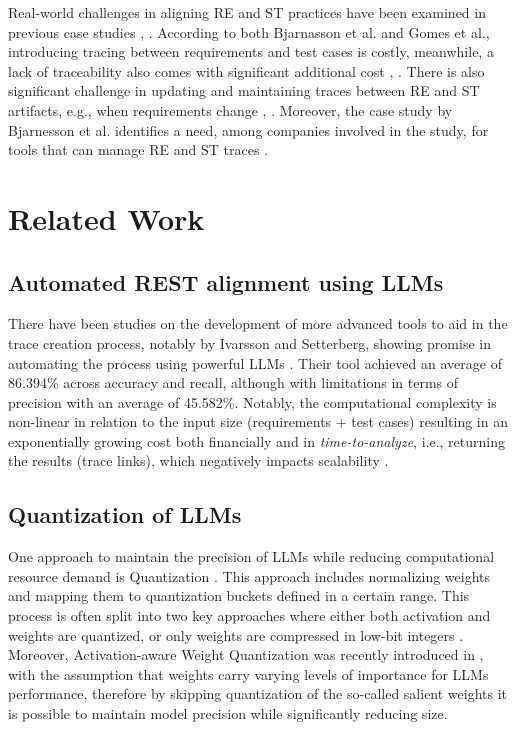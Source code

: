 \documentclass[conference]{IEEEtran}
\begin{document}
Real-world challenges in aligning RE and ST practices have been examined in
previous case studies \cite{bjarnason2014Challenges},
\cite{gomesdeoliveiranetoChallengesAligningRequirements2017}. According to both
Bjarnasson et al. and Gomes et al., introducing tracing between requirements and
test cases is costly, meanwhile, a lack of traceability also comes with
significant additional cost \cite{bjarnason2014Challenges},
\cite{gomesdeoliveiranetoChallengesAligningRequirements2017}. There is also
significant challenge in updating and maintaining traces between RE and ST
artifacts, e.g., when requirements change
\cite{bjarnason2014Challenges},
\cite{gomesdeoliveiranetoChallengesAligningRequirements2017}. Moreover, the case
study by Bjarnesson et al. identifies a need, among companies involved in the
study, for tools that can manage RE and ST traces
\cite{bjarnason2014Challenges}.

\section{Related Work}\label{relatedWork}

\subsection{Automated REST alignment using LLMs}

There have been studies on the development of more advanced tools to aid in the trace
creation process, notably by Ivarsson and Setterberg, showing promise in
automating the process using powerful LLMs \cite{ivarsson2023automated}. Their
tool achieved an average of 86.394\% across accuracy and recall, although with
limitations in terms of precision with an average of 45.582\%. Notably, the
computational complexity is non-linear in relation to the input size
(requirements + test cases) resulting in an exponentially growing cost both
financially and in \textit{time-to-analyze}, i.e., returning the results (trace
links), which negatively impacts scalability \cite{ivarsson2023automated}.


\subsection{Quantization of LLMs} One approach to maintain the precision of LLMs
while reducing computational resource demand is Quantization
\cite{dettmers2022llmint88bitmatrixmultiplication}. This approach includes
normalizing weights and mapping them to quantization buckets defined in a
certain range\cite{dettmers2022llmint88bitmatrixmultiplication}. This process is
often split into two key approaches where either both activation and weights are
quantized, or only weights are compressed in low-bit integers
\cite{dettmers2022llmint88bitmatrixmultiplication}. Moreover, Activation-aware
Weight Quantization was recently introduced in
\cite{linAWQActivationawareWeight2024}, with the assumption that weights carry
varying levels of importance for LLMs performance, therefore by skipping
quantization of the so-called salient weights it is possible to maintain model
precision while significantly reducing size.
\end{document}
